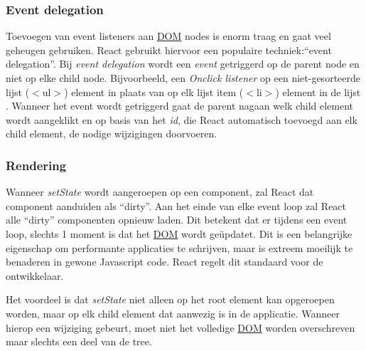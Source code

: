 	\subsubsection{Event delegation}
		
		Toevoegen van event listeners aan \hyperref[dom]{DOM} nodes is enorm traag en gaat veel geheugen gebruiken. React gebruikt hiervoor een populaire techniek:``event delegation''. Bij \emph{event delegation} wordt een \emph{event} getriggerd op de parent node en niet op elke child node. Bijvoorbeeld, een \emph{Onclick listener} op een niet-gesorteerde lijst ($<$ul$>$) element in plaats van op elk lijst item ($<$li$>$) element in de lijst . Wanneer het event wordt getriggerd gaat de parent nagaan welk child element wordt aangeklikt en op basis van het \emph{id}, die React automatisch toevoegd aan elk child element, de nodige wijzigingen doorvoeren.
	
	\subsubsection{Rendering}
		
		Wanneer \emph{setState} wordt aangeroepen op een component, zal React dat component aanduiden als ``dirty''. Aan het einde van elke event loop zal React alle ``dirty'' componenten opnieuw laden. Dit betekent dat er tijdens een event loop, slechts 1 moment is dat het \hyperref[dom]{DOM} wordt geüpdatet. Dit is een belangrijke eigenschap om performante applicaties te schrijven, maar is extreem moeilijk te benaderen in gewone Javascript code. React regelt dit standaard voor de ontwikkelaar.
		
		Het voordeel is dat \emph{setState} niet alleen op het root element kan opgeroepen worden, maar op elk child element dat aanwezig is in de applicatie. Wanneer hierop een wijziging gebeurt, moet niet het volledige \hyperref[dom]{DOM} worden overschreven maar slechts een deel van de tree.\citep{freed:virtual}
		
